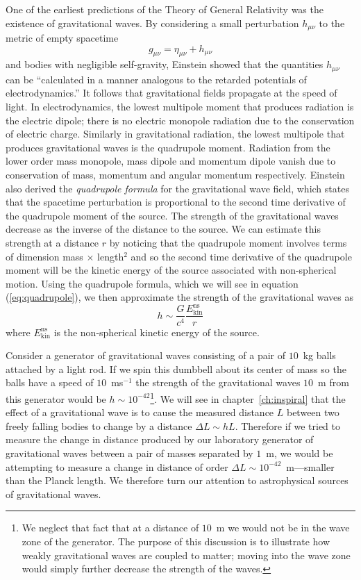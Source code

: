 One of the earliest predictions of the Theory of General Relativity was the
existence of gravitational waves. By considering a small perturbation
$h_{\mu\nu}$ to the metric of empty spacetime
\begin{equation}
g_{\mu\nu} = \eta_{\mu\nu} + h_{\mu\nu}
\end{equation}
and bodies with negligible self-gravity, Einstein showed that the quantities
$h_{\mu\nu}$ can be ``calculated in a manner analogous to the retarded
potentials of electrodynamics\cite{Einstein:1916}.''  It follows that
gravitational fields propagate at the speed of light.  In electrodynamics, the
lowest multipole moment that produces radiation is the electric dipole; there
is no electric monopole radiation due to the conservation of electric charge.
Similarly in gravitational radiation, the lowest multipole that produces
gravitational waves is the quadrupole moment. Radiation from the lower order
mass monopole, mass dipole and momentum dipole vanish due to conservation of
mass, momentum and angular momentum respectively. Einstein also derived the
\emph{quadrupole formula} for the gravitational wave field, which states that
the spacetime perturbation is proportional to the second time derivative of
the quadrupole moment of the source.  The strength of the gravitational waves
decrease as the inverse of the distance to the source.  We can estimate
this strength at a distance $r$ by noticing that the quadrupole moment
involves terms of dimension mass $\times$ length$^2$ and so the second time
derivative of the quadrupole moment will be the kinetic energy of the source
associated with non-spherical motion. Using the quadrupole formula, which we
will see in equation (\ref{eq:quadrupole}), we then approximate the strength
of the gravitational waves as
\begin{equation}
h \sim \frac{G}{c^4}\frac{E^\mathrm{ns}_\mathrm{kin}}{r}
\label{eq:strainest}
\end{equation}
where $E^\mathrm{ns}_\mathrm{kin}$ is the non-spherical kinetic energy of
the source.

Consider a generator of gravitational waves consisting of a pair of $10$~kg
balls attached by a light rod. If we spin this dumbbell about its center of
mass so the balls have a speed of $10$~ms$^{-1}$ the strength of the
gravitational waves $10$~m from this generator would be $h \sim
10^{-42}$\footnote{We neglect that fact that at a distance of $10$~m we would
not be in the wave zone of the generator. The purpose of this discussion is to
illustrate how weakly gravitational waves are coupled to matter; moving into
the wave zone would simply further decrease the strength of the waves.}.  We
will see in chapter~\ref{ch:inspiral} that the effect of a gravitational wave
is to cause the measured distance $L$ between two freely falling bodies to
change by a distance $\Delta L \sim h L$. Therefore if we tried to
measure the change in distance produced by our laboratory generator of
gravitational waves between a pair of masses separated by $1$~m, we would be
attempting to measure a change in distance of order $\Delta L \sim
10^{-42}$~m---smaller than the Planck length.  We therefore turn our
attention to astrophysical sources of gravitational waves.

